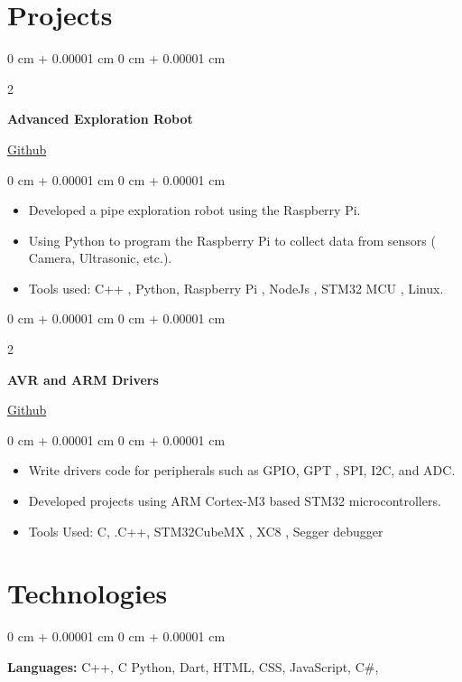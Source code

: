 \documentclass[10pt, letterpaper]{article}
\newenvironment{highlights}{
    \begin{itemize}[
        topsep=0.10 cm,
        parsep=0.10 cm,
        partopsep=0pt,
        itemsep=0pt,
        leftmargin=0 cm + 10pt
    ]
}{
    \end{itemize}
} %
\newenvironment{onecolentry}{
    \begin{adjustwidth}{
        0 cm + 0.00001 cm
    }{
        0 cm + 0.00001 cm
    }
}{
    \end{adjustwidth}
} %
\newenvironment{twocolentry}[2][]{
    \onecolentry
    \def\secondColumn{#2}
    \setcolumnwidth{\fill, 4.5 cm}
    \begin{paracol}{2}
}{
    \switchcolumn \raggedleft \secondColumn
    \end{paracol}
    \endonecolentry
} %
\begin{document}
    \section{Projects}

        
            \begin{twocolentry}{
                \href{https://github.com/melgazar24/}{Github}
            }
                \textbf{Advanced Exploration Robot}
            \end{twocolentry}

            \vspace{0.10 cm}
            \begin{onecolentry}
                \begin{highlights}
                    \item Developed a pipe exploration robot using the Raspberry Pi.
                    \item Using Python to program the Raspberry Pi to collect data from sensors ( Camera, Ultrasonic, etc.).
                    \item Tools used: C++ , Python, Raspberry Pi , NodeJs , STM32 MCU , Linux.
                \end{highlights}
            \end{onecolentry}
            
            \begin{twocolentry}{
                \href{https://github.com/melgazar24/}{Github}
            }
                \textbf{AVR and ARM Drivers}
            \end{twocolentry}

            \vspace{0.10 cm}
            \begin{onecolentry}
                \begin{highlights}
                    \item Write drivers code for peripherals such as GPIO, GPT , SPI, I2C, and ADC.
                    \item Developed projects using ARM Cortex-M3 based STM32 microcontrollers.
                    \item Tools Used: C, .C++, STM32CubeMX , XC8 , Segger debugger
                \end{highlights}
            \end{onecolentry}
            
                        \section{Technologies}
                            \begin{onecolentry}
                                        \textbf{Languages:  } C++,   C Python,  Dart,  HTML,  CSS,  JavaScript,  C\#, 
                                \end{onecolentry}
\end{document}
